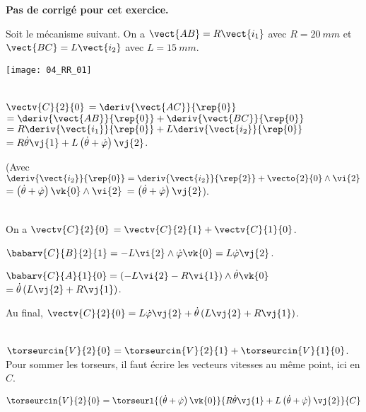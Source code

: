 \normaltrue
\correctiontrue


\setcounter{numques}{0}
\ifcorrection
\else
\textbf{Pas de corrigé pour cet exercice.}
\fi

\ifprof
\else
Soit le mécanisme suivant. On a $\vect{AB}=R\vect{i_1}$ avec $R=\SI{20}{mm}$ et  
$\vect{BC}=L\vect{i_2}$ avec $L=\SI{15}{mm}$.
\begin{center}
\texttt{[image: 04\_RR\_01]}
\end{center}
\fi

\ifprof ~\\
$\vectv{C}{2}{0}$ $ = \deriv{\vect{AC}}{\rep{0}}$
$ = \deriv{\vect{AB}}{\rep{0}}+\deriv{\vect{BC}}{\rep{0}}$
$ = R\deriv{\vect{i_1}}{\rep{0}}+L\deriv{\vect{i_2}}{\rep{0}}$
$ = R\dot{\theta}\vj{1}+L\left( \dot{\theta}+\dot{\varphi}\right)\vj{2}$.

(Avec $\deriv{\vect{i_2}}{\rep{0}} = \deriv{\vect{i_2}}{\rep{2}} + \vecto{2}{0}\wedge \vi{2}$
$ = \left( \dot{\theta}+\dot{\varphi}\right)\vk{0}\wedge \vi{2}$ $ = \left( \dot{\theta}+\dot{\varphi}\right)\vj{2}$).
\else
\fi


\ifprof ~\\
On a $\vectv{C}{2}{0} $ $= \vectv{C}{2}{1}+\vectv{C}{1}{0}$.

$\babarv{C}{B}{2}{1} = -L\vi{2}\wedge \dot{\varphi}\vk{0}= L\dot{\varphi}\vj{2}$.

$\babarv{C}{A}{1}{0} = \left( -L\vi{2} -R\vi{1}\right)\wedge  \dot{\theta}\vk{0}$
$=\dot{\theta}\left( L\vj{2} +R\vj{1}\right)$.

Au final, $\vectv{C}{2}{0} = L\dot{\varphi}\vj{2} + \dot{\theta}\left( L\vj{2} +R\vj{1}\right)$.

\else
\fi

\ifprof ~\\
$\torseurcin{V}{2}{0}=\torseurcin{V}{2}{1}+\torseurcin{V}{1}{0}$. Pour sommer les torseurs, il faut écrire les vecteurs vitesses au même point, ici en $C$. 

$\torseurcin{V}{2}{0}=\torseurl{ \left( \dot{\theta}+\dot{\varphi}\right)\vk{0}}{R\dot{\theta}\vj{1}+L\left( \dot{\theta}+\dot{\varphi}\right)\vj{2}}{C}$
 \else
\fi

